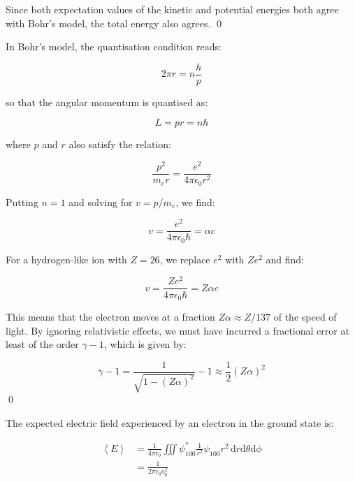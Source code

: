 \documentclass[12pt]{article}
\begin{document}
Since both expectation values of the kinetic and potential energies both agree with Bohr's model, the total energy also agrees.
\qed


In Bohr's model, the quantisation condition reads:

\begin{equation}
    2 \pi r = n \frac{h}{p}
\end{equation}

so that the angular momentum is quantised as:

\begin{equation}
    L = pr = n \hbar
\end{equation}

where $p$ and $r$ also satisfy the relation:

\begin{equation}
    \frac{p^{2}}{m_{e}r} = \frac{e^{2}}{4 \pi \epsilon_{0} r^{2}}
\end{equation}

Putting $n = 1$ and solving for $v = p/m_{e}$, we find:

\begin{equation}
    v = \frac{e^{2}}{4 \pi \epsilon_{0} \hbar} = \alpha c
\end{equation}

For a hydrogen-like ion with $Z = 26$, we replace $e^{2}$ with $Ze^{2}$ and find:

\begin{equation}
    v = \frac{Ze^{2}}{4 \pi \epsilon_{0} \hbar} = Z\alpha c
\end{equation}

This means that the electron moves at a fraction $Z\alpha \approx Z/137$ of the speed of light. By ignoring relativistic effects, we must have incurred a fractional error at least of the order $\gamma - 1$, which is given by:

\begin{equation}
    \gamma - 1 = \frac{1}{\sqrt{1 - (Z\alpha)^{2}}} - 1 \approx \frac{1}{2} (Z\alpha)^{2}
\end{equation}
\qed


The expected electric field experienced by an electron in the ground state is:

\begin{equation}
    \begin{split}
        \left\langle E \right\rangle &= \frac{1}{4\pi \epsilon_{0}} \iiint \psi_{100}^{*} \frac{1}{r^{2}} \psi_{100} r^{2} \, \mathrm{d}r \mathrm{d}\theta \mathrm{d}\phi \\
        &= \frac{1}{2\pi\epsilon_{0} a_{0}^{2}}
    \end{split}
\end{equation}
\end{document}
